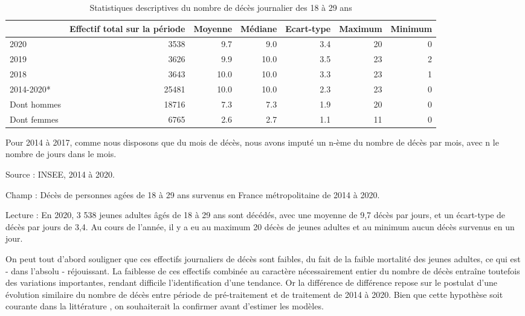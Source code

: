 \documentclass[titlepage]{article}
\begin{document}
\begin{table}[!h]

\caption{\label{tab:Descr}Statistiques descriptives du nombre de décès journalier des 18 à 29 ans}
\centering
\begin{threeparttable}
\begin{tabular}[t]{lrrrrrr}
\toprule
  & Effectif total sur la période & Moyenne & Médiane & Ecart-type & Maximum & Minimum\\
\midrule
2020 & 3538 & 9.7 & 9.0 & 3.4 & 20 & 0\\
2019 & 3626 & 9.9 & 10.0 & 3.5 & 23 & 2\\
2018 & 3643 & 10.0 & 10.0 & 3.3 & 23 & 1\\
2014-2020* & 25481 & 10.0 & 10.0 & 2.3 & 23 & 0\\
\hspace{1em}Dont hommes & 18716 & 7.3 & 7.3 & 1.9 & 20 & 0\\
\addlinespace
\hspace{1em}Dont femmes & 6765 & 2.6 & 2.7 & 1.1 & 11 & 0\\
\bottomrule
\end{tabular}
\begin{tablenotes}
\small
\item *Pour 2014 à 2017, comme nous disposons que du mois de décès, nous avons imputé un n-ème du nombre de décès par mois, avec n le nombre de jours dans le mois.
\item Source : INSEE, 2014 à 2020.
\item Champ : Décès de personnes agées de 18 à 29 ans survenus en France métropolitaine de 2014 à 2020.
\item Lecture : En 2020, 3 538 jeunes adultes âgés de 18 à 29 ans sont décédés, avec une moyenne de 9,7 décès par jours, et un écart-type de décès par jours de 3,4. Au cours de l'année, il y a eu au maximum 20 décès de jeunes adultes et au minimum aucun décès survenus en un jour.
\end{tablenotes}
\end{threeparttable}
\end{table}
On peut tout d'abord souligner que ces effectifs journaliers de décès sont faibles, du fait de la faible mortalité des jeunes adultes, ce qui est - dans l'absolu - réjouissant. La faiblesse de ces effectifs combinée au caractère nécessairement entier du nombre de décès entraîne toutefois des variations importantes, rendant difficile l'identification d'une tendance. Or la différence de différence repose sur le postulat d'une évolution similaire du nombre de décès entre période de pré-traitement et de traitement de 2014 à 2020. Bien que cette hypothèse soit courante dans la littérature \parencite{breton_levolution_2019}, on souhaiterait la confirmer avant d'estimer les modèles.\\
\end{document}
